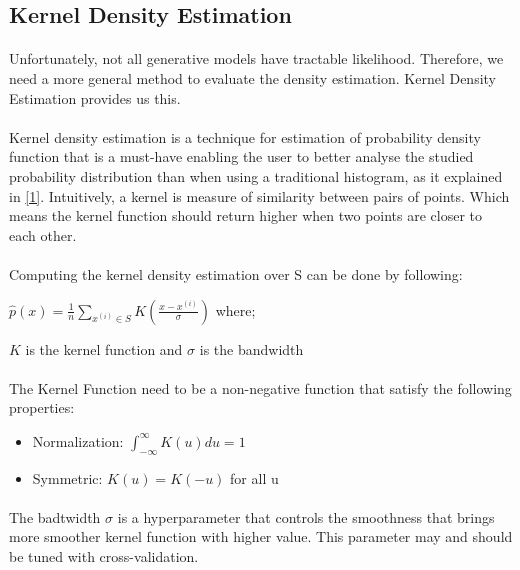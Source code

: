 \documentclass{article}
\begin{document}
    \subsection{Kernel Density Estimation}
    \paragraph{}
    Unfortunately, not all generative models have tractable likelihood. Therefore, we need a more general method to evaluate the density estimation. Kernel Density Estimation provides us this.
    \paragraph{}
    Kernel density estimation is a technique for estimation of probability density function that is a must-have enabling the user to better analyse the studied probability distribution than when using a traditional histogram, as it explained in \hyperref[sec: ref1]{[1]}. Intuitively, a kernel is measure of similarity between pairs of points. Which means the kernel function should return higher when two points are closer to each other.
    \paragraph{}
    Computing the kernel density estimation over S can be done by following: \\
    \begin{center}
        $ \widehat{p}(x) = \frac{1}{n} \sum_{x^(i) \in S}K(\frac{x - x^{(i)}}{\sigma}) $ where;
    \end{center}
    \begin{center}
        $K $ is the kernel function and $ \sigma$ is the bandwidth
    \end{center}
    \paragraph{}
    The Kernel Function need to be a non-negative function that satisfy the following properties:
    \begin{itemize}
        \item Normalization: $ \int_{-\infty}^{\infty} K(u) du = 1 $
        \item Symmetric: $ K(u) = K(-u) $ for all u
    \end{itemize}
    \paragraph{}
    The badtwidth $\sigma$ is a hyperparameter that controls the smoothness that brings more smoother kernel function with higher value. This parameter may and should be tuned with cross-validation.
\end{document}
